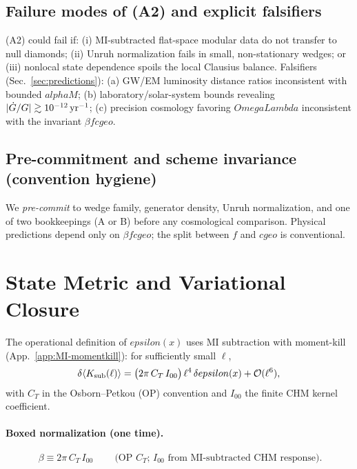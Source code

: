 \documentclass[aps,prd,onecolumn,superscriptaddress,nofootinbib]{revtex4-2}
\def\OmL{OmegaLambda}%
\def\cgeo{cgeo}%
\def\alphaM{alphaM}%
\def\eps{epsilon}%
\def\boxed#1{#1}%
\newcommand{\OmL}{\Omega_\Lambda}
\newcommand{\cgeo}{c_{\rm geo}}
\newcommand{\alphaM}{\alpha_M}
\newcommand{\eps}{\varepsilon}
\begin{document}
\subsection{Failure modes of (A2) and explicit falsifiers}
\label{sec:a2-fail}
(A2) could fail if: (i) MI-subtracted flat-space modular data do not transfer to null diamonds; (ii) Unruh normalization fails in small, non-stationary wedges; or (iii) nonlocal state dependence spoils the local Clausius balance. Falsifiers (Sec.~\ref{sec:predictions}): (a) GW/EM luminosity distance ratios inconsistent with bounded $\alphaM$; (b) laboratory/solar-system bounds revealing $|\dot G/G|\gtrsim 10^{-12}\,{\rm yr}^{-1}$; (c) precision cosmology favoring $\OmL$ inconsistent with the invariant $\beta f \cgeo$.

\subsection{Pre-commitment and scheme invariance (convention hygiene)}
\label{sec:precommit}
We \emph{pre-commit} to wedge family, generator density, Unruh normalization, and one of two bookkeepings (A or B) before any cosmological comparison. Physical predictions depend only on $\beta f \cgeo$; the split between $f$ and $\cgeo$ is conventional.

\section{State Metric and Variational Closure}
\label{sec:state-metric}
The operational definition of $\eps(x)$ uses MI subtraction with moment-kill (App.~\ref{app:MI-momentkill}): for sufficiently small $\ell$,
\begin{equation}
\label{eq:sigma-operational}
\delta\langle K_{\rm sub}(\ell)\rangle = \big(2\pi\, C_T\, I_{00}\big)\,\ell^4\,\delta\eps(x) + \mathcal O(\ell^6),
\end{equation}
with $C_T$ in the Osborn--Petkou (OP) convention and $I_{00}$ the finite CHM kernel coefficient.

\paragraph*{Boxed normalization (one time).}
\begin{equation}
\boxed{\ \beta \equiv 2\pi\, C_T\, I_{00}\ }\qquad
\text{(OP $C_T$; $I_{00}$ from MI-subtracted CHM response).}
\label{eq:beta-box}
\end{equation}
\end{document}
